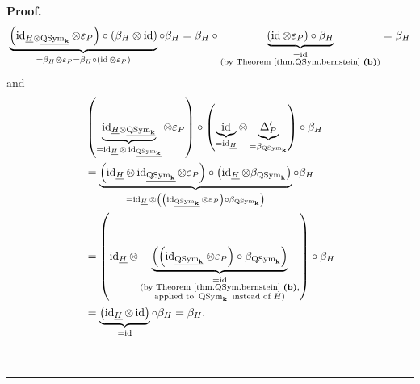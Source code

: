 \documentclass[numbers=enddot,12pt,final,onecolumn,notitlepage,abstracton]{scrartcl}%
\theoremstyle{definition}
\newenvironment{proof}[1][Proof]{\noindent\textbf{#1.} }{\ \rule{0.5em}{0.5em}}
\begin{document}
\begin{proof}
\[
\underbrace{\left(  \operatorname*{id}\nolimits_{\underline{H}\otimes
\underline{\operatorname*{QSym}\nolimits_{\mathbf{k}}}}\otimes\varepsilon
_{P}\right)  \circ\left(  \beta_{H}\otimes\operatorname*{id}\right)  }%
_{=\beta_{H}\otimes\varepsilon_{P}=\beta_{H}\circ\left(  \operatorname*{id}%
\otimes\varepsilon_{P}\right)  }\circ\beta_{H}=\beta_{H}\circ
\underbrace{\left(  \operatorname*{id}\otimes\varepsilon_{P}\right)
\circ\beta_{H}}_{\substack{=\operatorname*{id}\\\text{(by Theorem
\ref{thm.QSym.bernstein} \textbf{(b)})}}}=\beta_{H}%
\]
and%
\begin{align*}
&  \left(  \underbrace{\operatorname*{id}\nolimits_{\underline{H}%
\otimes\underline{\operatorname*{QSym}\nolimits_{\mathbf{k}}}}}%
_{=\operatorname*{id}\nolimits_{\underline{H}}\otimes\operatorname*{id}%
\nolimits_{\underline{\operatorname*{QSym}\nolimits_{\mathbf{k}}}}}%
\otimes\varepsilon_{P}\right)  \circ\left(  \underbrace{\operatorname*{id}%
}_{=\operatorname*{id}\nolimits_{\underline{H}}}\otimes\underbrace{\Delta
_{P}^{\prime}}_{=\beta_{\operatorname*{QSym}\nolimits_{\mathbf{k}}}}\right)
\circ\beta_{H}\\
&  =\underbrace{\left(  \operatorname*{id}\nolimits_{\underline{H}}%
\otimes\operatorname*{id}\nolimits_{\underline{\operatorname*{QSym}%
\nolimits_{\mathbf{k}}}}\otimes\varepsilon_{P}\right)  \circ\left(
\operatorname*{id}\nolimits_{\underline{H}}\otimes\beta_{\operatorname*{QSym}%
\nolimits_{\mathbf{k}}}\right)  }_{=\operatorname*{id}\nolimits_{\underline{H}%
}\otimes\left(  \left(  \operatorname*{id}%
\nolimits_{\underline{\operatorname*{QSym}\nolimits_{\mathbf{k}}}}%
\otimes\varepsilon_{P}\right)  \circ\beta_{\operatorname*{QSym}%
\nolimits_{\mathbf{k}}}\right)  }\circ\beta_{H}\\
&  =\left(  \operatorname*{id}\nolimits_{\underline{H}}\otimes
\underbrace{\left(  \left(  \operatorname*{id}%
\nolimits_{\underline{\operatorname*{QSym}\nolimits_{\mathbf{k}}}}%
\otimes\varepsilon_{P}\right)  \circ\beta_{\operatorname*{QSym}%
\nolimits_{\mathbf{k}}}\right)  }_{\substack{=\operatorname*{id}\\\text{(by
Theorem \ref{thm.QSym.bernstein} \textbf{(b)},}\\\text{applied to
}\operatorname*{QSym}\nolimits_{\mathbf{k}}\text{ instead of }H\text{)}%
}}\right)  \circ\beta_{H}\\
&  =\underbrace{\left(  \operatorname*{id}\nolimits_{\underline{H}}%
\otimes\operatorname*{id}\right)  }_{=\operatorname*{id}}\circ\beta_{H}%
=\beta_{H}.
\end{align*}



\end{proof}
\end{document}
